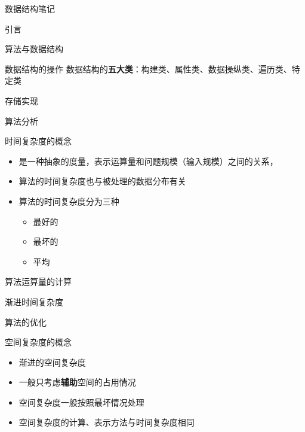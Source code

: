 \documentclass[
  ignorenonframetext,
]{beamer}
\providecommand{\tightlist}{%
  \setlength{\itemsep}{0pt}\setlength{\parskip}{0pt}}
\begin{document}
\begin{frame}[fragile]{数据结构笔记}
\begin{block}{引言}
\begin{block}{算法与数据结构}
\begin{block}{数据结构的操作}
数据结构的\textbf{五大类}：构建类、属性类、数据操纵类、遍历类、特定类
\end{block}
\end{block}

\begin{block}{存储实现}
\protect{}\label{ux5b58ux50a8ux5b9eux73b0}
\end{block}

\begin{block}{算法分析}
\protect{}\label{ux7b97ux6cd5ux5206ux6790}
\begin{block}{时间复杂度的概念}
\protect{}\label{ux65f6ux95f4ux590dux6742ux5ea6ux7684ux6982ux5ff5}
\begin{itemize}
\tightlist
\item
  是一种抽象的度量，表示运算量和问题规模（输入规模）之间的关系，{}
\item
  算法的时间复杂度也与被处理的数据分布有关
\item
  算法的时间复杂度分为三种

  \begin{itemize}
  \tightlist
  \item
    最好的
  \item
    最坏的
  \item
    平均
  \end{itemize}
\end{itemize}
\end{block}

\begin{block}{算法运算量的计算}
\protect{}\label{ux7b97ux6cd5ux8fd0ux7b97ux91cfux7684ux8ba1ux7b97}
\end{block}

\begin{block}{渐进时间复杂度}
\protect{}\label{ux6e10ux8fdbux65f6ux95f4ux590dux6742ux5ea6}
\end{block}

\begin{block}{算法的优化}
\protect{}\label{ux7b97ux6cd5ux7684ux4f18ux5316}
\end{block}

\begin{block}{空间复杂度的概念}
\protect{}\label{ux7a7aux95f4ux590dux6742ux5ea6ux7684ux6982ux5ff5}
\begin{itemize}
\tightlist
\item
  渐进的空间复杂度
\item
  一般只考虑\textbf{辅助}空间的占用情况
\item
  空间复杂度一般按照最坏情况处理
\item
  空间复杂度的计算、表示方法与时间复杂度相同
\end{itemize}
\end{block}
\end{block}


\end{block}
\end{frame}
\end{document}
